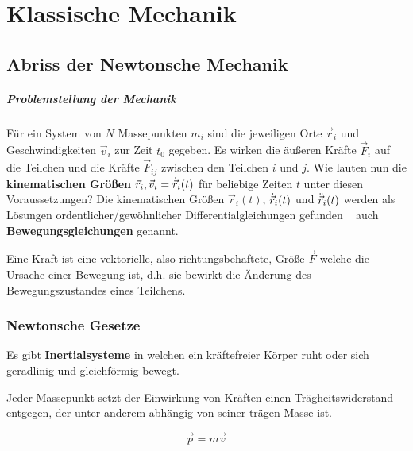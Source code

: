 \chapter{Klassische Mechanik}

\section{Abriss der Newtonsche Mechanik}
\paragraph{Problemstellung der Mechanik}
Für ein System von $N$ Massepunkten $m_i$ sind die jeweiligen Orte $\vec{r}_i$ und Geschwindigkeiten $\vec{v}_i$ zur Zeit $t_0$ gegeben. Es wirken die äußeren Kräfte $\vec{F}_i$ auf die Teilchen und die Kräfte $\vec{F}_{ij}$ zwischen den Teilchen $i$ und $j$. Wie lauten nun die \textbf{kinematischen Größen} $\vec{r}_i, \vec{v}_i = \dot{\vec{r}}_i(t)$  für beliebige Zeiten $t$ unter diesen Voraussetzungen? Die kinematischen Größen $\vec{r}_i(t)$, $\dot{\vec{r}}_i(t)$ und $\ddot{\vec{r}}_i(t)$ werden als Lösungen ordentlicher/gewöhnlicher Differentialgleichungen gefunden \textendash~ auch  \textbf{Bewegungsgleichungen} genannt.\\

\begin{definition*}[Kraft]
Eine Kraft ist eine vektorielle, also richtungsbehaftete, Größe $\vec{F}$ welche die Ursache einer Bewegung ist, d.h. sie bewirkt die Änderung des Bewegungszustandes eines Teilchens.
\end{definition*}

\subsection{Newtonsche Gesetze}
\begin{definition*} 
Es gibt \textbf{Inertialsysteme} in welchen ein kräftefreier Körper ruht oder sich geradlinig und gleichförmig bewegt.
\end{definition*}

\begin{definition*}
	Jeder Massepunkt setzt der Einwirkung von Kräften einen Trägheitswiderstand entgegen, der unter anderem abhängig von seiner trägen Masse ist.
\end{definition*}

\begin{definition*}[Impuls]
	\begin{equation*}
		\vec{p} = m \vec{v}
	\end{equation*}
\end{definition*}

